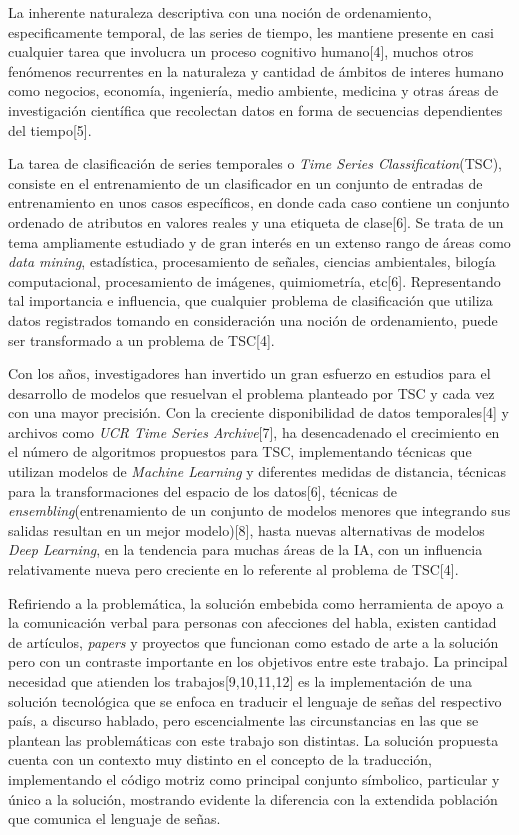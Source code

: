 
\hfill\break
\justifying
La inherente naturaleza descriptiva con una noción de ordenamiento, especificamente temporal, de las series de tiempo, les mantiene presente en casi cualquier tarea que involucra un proceso cognitivo humano[4], muchos otros fenómenos recurrentes en la naturaleza y cantidad de ámbitos de interes humano como negocios, economía, ingeniería, medio ambiente, medicina y otras áreas de investigación científica que recolectan datos en forma de secuencias dependientes del tiempo[5].

\hfill\break
\justifying
La tarea de clasificación de series temporales o \textit{Time Series Classification}(TSC), consiste en el entrenamiento de un clasificador en un conjunto de entradas de entrenamiento en unos casos específicos, en donde cada caso contiene un conjunto ordenado de atributos en valores reales y una etiqueta de clase[6]. Se trata de un tema ampliamente estudiado y de gran interés en un extenso rango de áreas como \textit{data mining}, estadística, procesamiento de señales, ciencias ambientales, bilogía computacional, procesamiento de imágenes, quimiometría, etc[6]. Representando tal importancia e influencia, que cualquier problema de clasificación que utiliza datos registrados tomando en consideración una noción de ordenamiento, puede ser transformado a un problema de TSC[4].

\hfill\break
\justifying
Con los años, investigadores han invertido un gran esfuerzo en estudios para el desarrollo de modelos que resuelvan el problema planteado por TSC y cada vez con una mayor precisión. Con la creciente disponibilidad de datos temporales[4] y archivos como \textit{UCR Time Series Archive}[7], ha desencadenado el crecimiento en el número de algoritmos propuestos para TSC, implementando técnicas que utilizan modelos de \textit{Machine Learning} y diferentes medidas de distancia, técnicas para la transformaciones del espacio de los datos[6], técnicas de \textit{ensembling}(entrenamiento de un conjunto de modelos menores que integrando sus salidas resultan en un mejor modelo)[8], hasta nuevas alternativas de modelos \textit{Deep Learning}, en la tendencia para muchas áreas de la IA, con un influencia relativamente nueva pero creciente en lo referente al problema de TSC[4].

\hfill\break
\justifying
Refiriendo a la problemática, la solución embebida como herramienta de apoyo a la comunicación verbal para personas con afecciones del habla, existen cantidad de artículos, \textit{papers} y proyectos que funcionan como estado de arte a la solución pero con un contraste importante en los objetivos entre este trabajo. La principal necesidad que atienden los trabajos[9,10,11,12] es la implementación de una solución tecnológica que se enfoca en traducir el lenguaje de señas del respectivo país, a discurso hablado, pero escencialmente las circunstancias en las que se plantean las problemáticas con este trabajo son distintas. La solución propuesta cuenta con un contexto muy distinto en el concepto de la traducción, implementando el código motriz como principal conjunto símbolico, particular y único a la solución, mostrando evidente la diferencia con la extendida población que comunica el lenguaje de señas.

